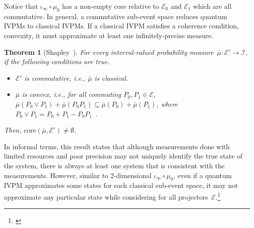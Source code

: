 \documentclass[english,reprint, aps, prl,superscriptaddress, showpacs,
showkeys, longbibliography, amsmath, amssymb]{revtex4-1}
\theoremstyle{plain}
\newtheorem{thm}{Theorem}
\theoremstyle{definition}
\newcommand{\events}{\ensuremath{\mathcal{E}}}
\newcommand{\yutsung}[1]{\begin{framed}\begin{minipage}{0.9\linewidth}\color{purple}{Yu-Tsung says: #1}\end{minipage}\end{framed}}
\begin{document}
Notice that $\iota_{\infty}\circ\mu_{0}$ has a non-empty core relative
to $\events_{0}$ and $\events_{1}$ which are all commutative. In
general, a commutative sub-event space reduces quantum IVPMs to classical
IVPMs. If a classical IVPM satisfies a coherence condition, convexity,
it must approximate at least one infinitely-precise measure.

\begin{thm}[Shapley~\cite{Shapley1971,Grabisch2016}]\label{thm:Shapley}For
every interval-valued probability measure~$\bar{\mu}:\events'\rightarrow\mathscr{I}$,
if the following conditions are true.
\begin{itemize}
\item $\events'$ is commutative, i.e., $\bar{\mu}$ is classical.
\item $\bar{\mu}$ is convex, i.e., for all commuting $P_{0},P_{1}\in\events$,
$\bar{\mu}\left(P_{0}\vee P_{1}\right)+\bar{\mu}\left(P_{0}P_{1}\right)\subseteq\bar{\mu}\left(P_{0}\right)+\bar{\mu}\left(P_{1}\right)$,
where $P_{0}\vee P_{1}=P_{0}+P_{1}-P_{0}P_{1}$~\cite{Griffiths2003}.
\end{itemize}
Then, $\mathrm{core}\left(\bar{\mu},\events'\right)\ne\emptyset$.\end{thm}

In informal terms, this result states that although measurements done
with limited resources and poor precision may not uniquely identify
the true state of the system, there is always at least one system
that is consistent with the measurements. However, similar to 2-dimensional
$\iota_{\infty}\circ\mu_{0}$, even if a quantum IVPM approximates
some states for each classical sub-event space, it may not approximate
any particular state while considering for all projectors~$\events$.\footnote{\yutsung{It seems that our example in 4 dimensions together with
relativity core would be unnecessary complex. Therefore, I roll our
example back to 3 dimensions.}}
\end{document}

